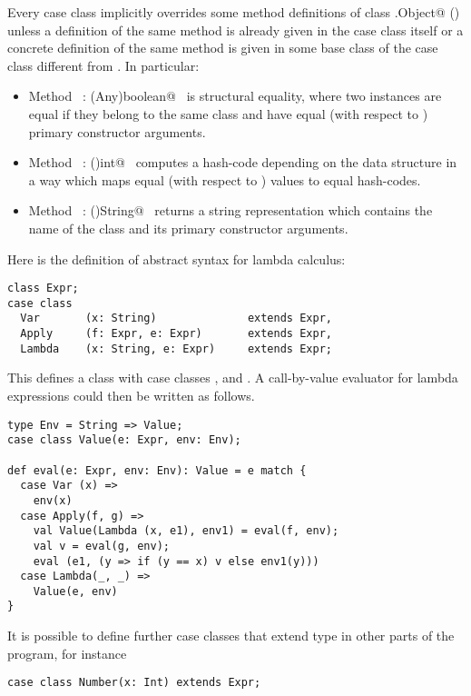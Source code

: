 \documentclass[a4paper,12pt,twoside,titlepage]{book}
\begin{document}
Every case class implicitly overrides some method definitions of class
\lstinline@scala.Object@ () unless a definition of the same
method is already given in the case class itself or a concrete
definition of the same method is given in some base class of the case
class different from . In particular:
\begin{itemize}
\item[] Method ~\lstinline@equals: (Any)boolean@~ is structural equality, where two
instances are equal if they belong to the same class and
have equal (with respect to ) primary constructor arguments.
\item[] Method ~\lstinline@hashCode: ()int@~ computes a hash-code
depending on the data structure in a way which maps equal (with respect to
) values to equal hash-codes.
\item[] Method ~\lstinline@toString: ()String@~ returns a string representation which
contains the name of the class and its primary constructor arguments.
\end{itemize}

\example Here is the definition of abstract syntax for lambda
calculus:

\begin{lstlisting}
class Expr;
case class
  Var       (x: String)              extends Expr,
  Apply     (f: Expr, e: Expr)       extends Expr,
  Lambda    (x: String, e: Expr)     extends Expr;
\end{lstlisting}
This defines a class  with case classes
,  and . A call-by-value evaluator for lambda
expressions could then be written as follows.

\begin{lstlisting}
type Env = String => Value;
case class Value(e: Expr, env: Env);

def eval(e: Expr, env: Env): Value = e match {
  case Var (x) =>
    env(x)
  case Apply(f, g) =>
    val Value(Lambda (x, e1), env1) = eval(f, env);
    val v = eval(g, env);
    eval (e1, (y => if (y == x) v else env1(y)))
  case Lambda(_, _) =>
    Value(e, env)
}
\end{lstlisting}

It is possible to define further case classes that extend type
 in other parts of the program, for instance
\begin{lstlisting}
case class Number(x: Int) extends Expr;
\end{lstlisting}
\end{document}
